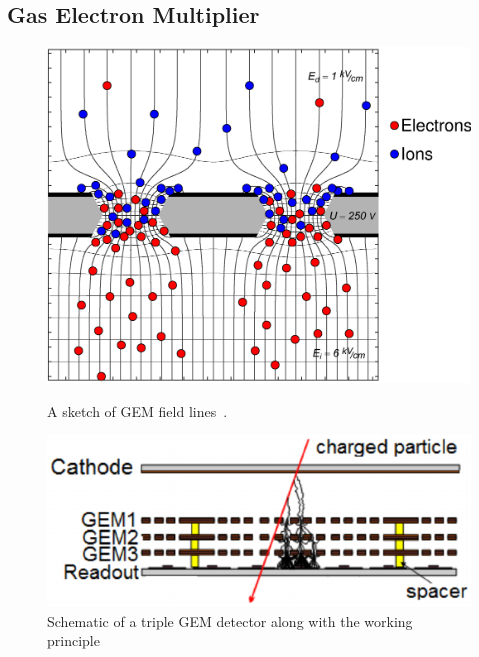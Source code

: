 \subsection{Gas Electron Multiplier}
\label{sec:GEM}

 \begin{figure}[t!]
 \centering
   \begin{minipage}[t]{.45\textwidth}
     \centering
     \includegraphics[width=\linewidth]{thesis_figures/GEM_field.png}

     \caption{A sketch of GEM field lines~\cite{GEM_field}.}
     \label{fig:GEM_field}
   \end{minipage}
   \hfill
   \begin{minipage}[t]{.45\textwidth}
     \centering
     \includegraphics[width=\linewidth]{thesis_figures/GEM_process.png}
     \caption{Schematic of a triple GEM detector along with the working principle~\cite{article_GEM_pic}}
     \label{fig:Triple_GEM}
   \end{minipage}
 \end{figure}

